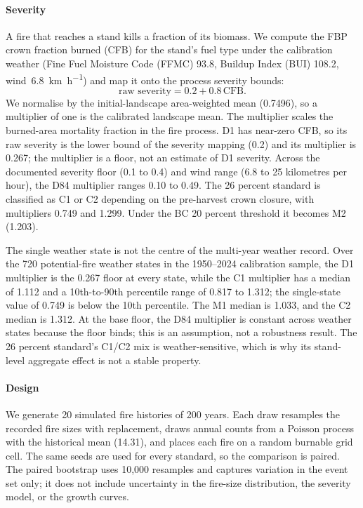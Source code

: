 \paragraph{Severity} A fire that reaches a stand kills a fraction of its biomass. We compute the
FBP crown fraction burned (CFB) for the stand's fuel type under the calibration weather (Fine Fuel
Moisture Code (FFMC) 93.8, Buildup Index (BUI) 108.2, wind~\SI{6.8}{\kilo\meter\per\hour}) and map it onto the
process severity bounds:
\[
  \text{raw severity} = 0.2 + 0.8\,\text{CFB}.
\]
We normalise by the initial-landscape area-weighted mean (0.7496), so a multiplier of one is the
calibrated landscape mean. The multiplier scales the burned-area mortality fraction in the fire
process. D1 has near-zero CFB, so its raw severity is the lower bound of the severity
mapping (0.2) and its multiplier is 0.267; the multiplier is a floor, not an estimate of D1 severity. Across the
documented severity floor (0.1 to 0.4) and wind range (6.8 to 25 kilometres per hour), the D84 multiplier
ranges 0.10 to 0.49. The 26 percent standard is classified as C1 or C2 depending on the pre-harvest
crown closure, with multipliers 0.749 and 1.299. Under the BC 20 percent threshold it becomes M2
(1.203).

The single weather state is not the centre of the multi-year weather record. Over the 720
potential-fire weather states in the 1950--2024 calibration sample, the D1 multiplier is the 0.267
floor at every state, while the C1 multiplier has a median of 1.112 and a 10th-to-90th percentile
range of 0.817 to 1.312; the single-state value of 0.749 is below the 10th percentile. The M1 median
is 1.033, and the C2 median is 1.312. At the base floor, the D84 multiplier is constant across
weather states because the floor binds; this is an assumption, not a robustness result. The 26 percent standard's C1/C2 mix is
weather-sensitive, which is why its stand-level aggregate effect is not a stable property.

\paragraph{Design} We generate 20 simulated fire histories of 200 years. Each draw resamples the recorded fire
sizes with replacement, draws annual counts from a Poisson process with the historical mean
(\num{14.31}), and places each fire on a random burnable grid cell. The same seeds are used for every
standard, so the comparison is paired. The paired bootstrap uses 10,000 resamples and captures variation in the event set only; it does not include
uncertainty in the fire-size distribution, the severity model, or the growth curves.

